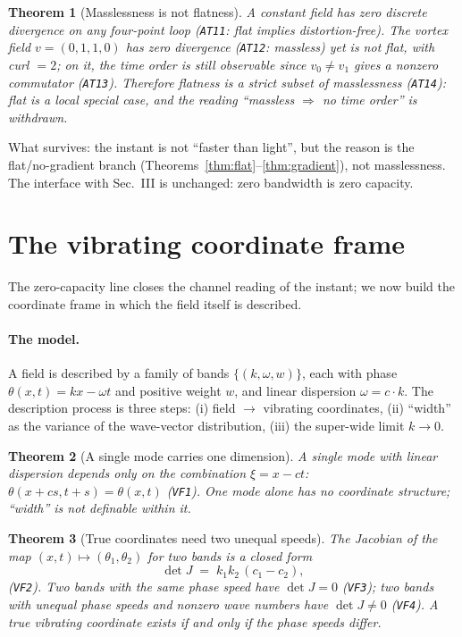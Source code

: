 \documentclass[aps,prd,preprint,superscriptaddress,amsmath,amssymb]{revtex4-2}
\newtheorem{theorem}{Theorem}[section]
\begin{document}
\begin{theorem}[Masslessness is not flatness]
\label{thm:contra}
A constant field has zero discrete divergence on any four-point loop
(\texttt{AT11}: flat implies distortion-free).  The vortex field
$v=(0,1,1,0)$ has zero divergence (\texttt{AT12}: massless) yet is
not flat, with curl $=2$; on it, the time order is still observable
since $v_0\ne v_1$ gives a nonzero commutator (\texttt{AT13}).
Therefore flatness is a strict subset of masslessness
(\texttt{AT14}): flat is a local special case, and the reading
``massless $\Rightarrow$ no time order'' is withdrawn.
\end{theorem}

What survives: the instant is not ``faster than light'', but the
reason is the flat/no-gradient branch (Theorems~\ref{thm:flat}--\ref{thm:gradient}),
not masslessness.  The interface with Sec.~III is unchanged:
zero bandwidth is zero capacity.

\section{The vibrating coordinate frame}
\label{sec:vibration}

The zero-capacity line closes the channel reading of the instant; we
now build the coordinate frame in which the field itself is
described.  \paragraph{The model.}
A field is described by a family of bands $\{(k,\omega,w)\}$, each
with phase $\theta(x,t)=kx-\omega t$ and positive weight $w$, and
linear dispersion $\omega=c\cdot k$.  The description process is three
steps: (i) field $\to$ vibrating coordinates, (ii) ``width'' as the
variance of the wave-vector distribution, (iii) the super-wide limit
$k\to0$.

\begin{theorem}[A single mode carries one dimension]
\label{thm:vf1}
A single mode with linear dispersion depends only on the combination
$\xi=x-ct$: $\theta(x+cs,t+s)=\theta(x,t)$ (\texttt{VF1}).  One mode
alone has no coordinate structure; ``width'' is not definable within
it.
\end{theorem}

\begin{theorem}[True coordinates need two unequal speeds]
\label{thm:vf2}
The Jacobian of the map $(x,t)\mapsto(\theta_1,\theta_2)$ for two
bands is a closed form
\begin{equation}
\det J \;=\; k_1k_2\,(c_1-c_2),
\label{eq:jac}
\end{equation}
(\texttt{VF2}).  Two bands with the same phase speed have
$\det J=0$ (\texttt{VF3}); two bands with unequal phase speeds and
nonzero wave numbers have $\det J\ne0$ (\texttt{VF4}).  \emph{A true
vibrating coordinate exists if and only if the phase speeds differ.}
\end{theorem}
\end{document}
